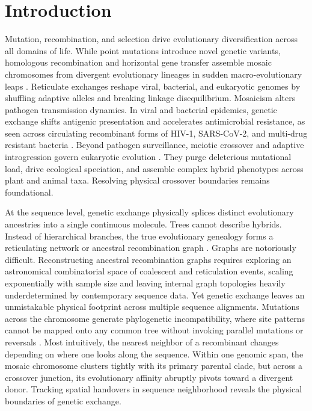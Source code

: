\section{Introduction}
\label{sec:introduction}

Mutation, recombination, and selection drive evolutionary diversification across all domains of life.
While point mutations introduce novel genetic variants, homologous recombination and horizontal gene transfer assemble mosaic chromosomes from divergent evolutionary lineages in sudden macro-evolutionary leaps \citep{simonloriere2011recombination,didelot2010impact}.
Reticulate exchanges reshape viral, bacterial, and eukaryotic genomes by shuffling adaptive alleles and breaking linkage disequilibrium.
Mosaicism alters pathogen transmission dynamics.
In viral and bacterial epidemics, genetic exchange shifts antigenic presentation and accelerates antimicrobial resistance, as seen across circulating recombinant forms of HIV-1, SARS-CoV-2, and multi-drug resistant bacteria \citep{alfonsi2024data,didelot2010impact}.
Beyond pathogen surveillance, meiotic crossover and adaptive introgression govern eukaryotic evolution \citep{rieseberg2003major,mcvean2004fine}.
They purge deleterious mutational load, drive ecological speciation, and assemble complex hybrid phenotypes across plant and animal taxa.
Resolving physical crossover boundaries remains foundational.

At the sequence level, genetic exchange physically splices distinct evolutionary ancestries into a single continuous molecule.
Trees cannot describe hybrids.
Instead of hierarchical branches, the true evolutionary genealogy forms a reticulating network or ancestral recombination graph \citep{hudson1983properties,griffiths1996ancestral}.
Graphs are notoriously difficult.
Reconstructing ancestral recombination graphs requires exploring an astronomical combinatorial space of coalescent and reticulation events, scaling exponentially with sample size and leaving internal graph topologies heavily underdetermined by contemporary sequence data.
Yet genetic exchange leaves an unmistakable physical footprint across multiple sequence alignments.
Mutations across the chromosome generate phylogenetic incompatibility, where site patterns cannot be mapped onto any common tree without invoking parallel mutations or reversals \citep{bruen2006simple,posada2002evaluation}.
Most intuitively, the nearest neighbor of a recombinant changes depending on where one looks along the sequence.
Within one genomic span, the mosaic chromosome clusters tightly with its primary parental clade, but across a crossover junction, its evolutionary affinity abruptly pivots toward a divergent donor.
Tracking spatial handovers in sequence neighborhood reveals the physical boundaries of genetic exchange.

